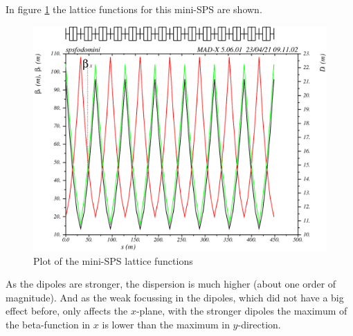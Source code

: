 In figure \ref{fig:sps_mini} the lattice functions for this mini-SPS are shown.
\begin{figure}[tbp]
    \centering
    \includegraphics[width=0.8\linewidth]{../../part2/sps_mini.png}
    \caption{Plot of the mini-SPS lattice functions}
    \label{fig:sps_mini}
\end{figure}
As the dipoles are stronger, the dispersion is much higher (about one order of magnitude). And as the weak focussing in the dipoles, which did not have a big effect before, only affects the $x$-plane, with the stronger dipoles the maximum of the beta-function in $x$ is lower than the maximum in $y$-direction.

\clearpage

